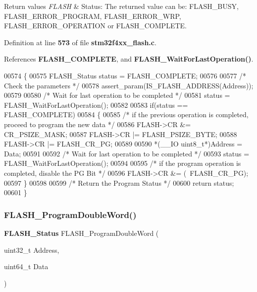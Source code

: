 \begin{DoxyRetVals}{Return values}
{\em F\+L\+A\+SH} & Status\+: The returned value can be\+: F\+L\+A\+S\+H\+\_\+\+B\+U\+SY, F\+L\+A\+S\+H\+\_\+\+E\+R\+R\+O\+R\+\_\+\+P\+R\+O\+G\+R\+AM, F\+L\+A\+S\+H\+\_\+\+E\+R\+R\+O\+R\+\_\+\+W\+RP, F\+L\+A\+S\+H\+\_\+\+E\+R\+R\+O\+R\+\_\+\+O\+P\+E\+R\+A\+T\+I\+ON or F\+L\+A\+S\+H\+\_\+\+C\+O\+M\+P\+L\+E\+TE. \\
\hline
\end{DoxyRetVals}


Definition at line \textbf{ 573} of file \textbf{ stm32f4xx\+\_\+flash.\+c}.



References \textbf{ F\+L\+A\+S\+H\+\_\+\+C\+O\+M\+P\+L\+E\+TE}, and \textbf{ F\+L\+A\+S\+H\+\_\+\+Wait\+For\+Last\+Operation()}.


\begin{DoxyCode}
00574 \{
00575   FLASH_Status status = FLASH_COMPLETE;
00576 
00577   \textcolor{comment}{/* Check the parameters */}
00578   assert_param(IS_FLASH_ADDRESS(Address));
00579 
00580   \textcolor{comment}{/* Wait for last operation to be completed */}
00581   status = FLASH_WaitForLastOperation();
00582   
00583   \textcolor{keywordflow}{if}(status == FLASH_COMPLETE)
00584   \{
00585     \textcolor{comment}{/* if the previous operation is completed, proceed to program the new data */}
00586     FLASH->CR &= CR_PSIZE_MASK;
00587     FLASH->CR |= FLASH_PSIZE_BYTE;
00588     FLASH->CR |= FLASH_CR_PG;
00589   
00590     *(\_\_IO uint8\_t*)Address = Data;
00591         
00592     \textcolor{comment}{/* Wait for last operation to be completed */}
00593     status = FLASH_WaitForLastOperation();
00594 
00595     \textcolor{comment}{/* if the program operation is completed, disable the PG Bit */}
00596     FLASH->CR &= (~FLASH_CR_PG);
00597   \} 
00598 
00599   \textcolor{comment}{/* Return the Program Status */}
00600   \textcolor{keywordflow}{return} status;
00601 \}
\end{DoxyCode}
\mbox{\label{group__FLASH__Group2_gab84b52121e58d0dbc8ff2a92145d20f2}} 
\subsubsection{F\+L\+A\+S\+H\+\_\+\+Program\+Double\+Word()}
{\footnotesize\ttfamily \textbf{ F\+L\+A\+S\+H\+\_\+\+Status} F\+L\+A\+S\+H\+\_\+\+Program\+Double\+Word (\begin{DoxyParamCaption}\item[{uint32\+\_\+t}]{Address,  }\item[{uint64\+\_\+t}]{Data }\end{DoxyParamCaption})}



